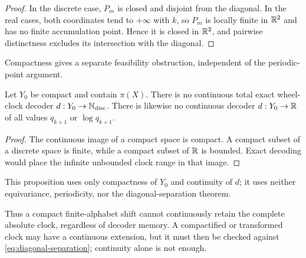 \begin{proof}
In the discrete case, $P_m$ is closed and disjoint from the diagonal.  In
the real cases, both coordinates tend to $+\infty$ with $k$, so $P_m$ is
locally finite in $\mathbb{R}^2$ and has no finite accumulation point.  Hence it is
closed in $\mathbb{R}^2$, and pairwise distinctness excludes its intersection with
the diagonal.
\end{proof}

Compactness gives a separate feasibility obstruction, independent of the
periodic-point argument.

\begin{proposition}
\label{prop:compact}
Let $Y_0$ be compact and contain $\pi(X)$.  There is no continuous total
exact wheel-clock decoder $d:Y_0\to\mathbb{N}_{\mathrm{disc}}$.  There is likewise
no continuous decoder $d:Y_0\to\mathbb{R}$ of all values $q_{k+1}$ or
$\log q_{k+1}$.
\end{proposition}

\begin{proof}
The continuous image of a compact space is compact.  A compact subset of a
discrete space is finite, while a compact subset of $\mathbb{R}$ is bounded.  Exact
decoding would place the infinite unbounded clock range in that image.
\end{proof}

This proposition uses only compactness of $Y_0$ and continuity of $d$; it
uses neither equivariance, periodicity, nor the diagonal-separation theorem.

Thus a compact finite-alphabet shift cannot continuously retain the complete
absolute clock, regardless of decoder memory.  A compactified or transformed
clock may have a continuous extension, but it must then be checked against
\eqref{eq:diagonal-separation}; continuity alone is not enough.
